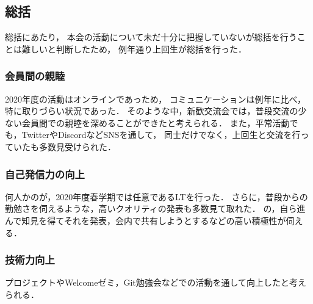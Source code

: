 \subsection*{\firstGrade{}総括}



\firstGrade{}総括にあたり，
本会の活動について未だ十分に把握していない\firstGrade{}が総括を行うことは難しいと判断したため，
例年通り上回生が総括を行った．


\subsubsection*{会員間の親睦}
2020年度の活動はオンラインであっため，
コミュニケーションは例年に比べ，特に取りづらい状況であった．
そのような中，新歓交流会では，普段交流の少ない会員間での親睦を深めることができたと考えられる．
また，平常活動でも，TwitterやDiscordなどSNSを通して，
\firstGrade{}同士だけでなく，上回生と交流を行っていた\firstGrade{}も多数見受けられた．


\subsubsection*{自己発信力の向上}
何人かの\firstGrade{}が，2020年度春学期では任意であるLTを行った．
さらに，普段からの勤勉さを伺えるような，高いクオリティの発表も多数見て取れた．
\firstGrade{}の，自ら進んで知見を得てそれを発表，会内で共有しようとするなどの高い積極性が伺える．


\subsubsection*{技術力向上}
プロジェクトやWelcomeゼミ，Git勉強会などでの活動を通して向上したと考えられる．
